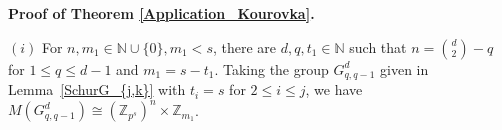 \documentclass[preprint,sort&compress,12pt]{elsarticle}
\newtheorem{corollary}[theorem]{Corollary}
\numberwithin{equation}{section}
\theoremstyle{definition}
\newcommand{\Z}{\mathbb{Z}}
\begin{document}
\noindent \textbf{Proof of Theorem \ref{Application_Kourovka}.}



   \noindent $(i)$ For $n, m_1 \in \mathbb N \cup \{0\}, m_1 <s$, there are $d, q, t_1 \in \mathbb N$ such that $n={d \choose 2}-q$ for $1 \leq q \leq d-1$ and $m_1=s-t_1$. 
   Taking the group $G_{q,q-1}^d$   given in Lemma~\ref{SchurG_{j,k}} with $t_i=s$ for  $2\leq i \leq j$, we have  ${M(G_{q,q-1}^d) \cong (\Z_{p^s})^{n} \times \Z_{m_1}}$.
   \\
   
\end{document}
